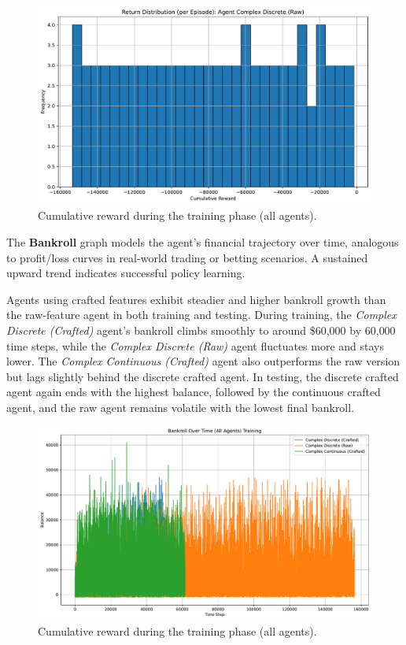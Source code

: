 \documentclass[sigconf]{acmart}
\begin{document}
\begin{figure}[t]
  \centering
  \includegraphics[width=\textwidth]{return_distribution_Complex Discrete (Raw).pdf}
  \caption{Cumulative reward during the training phase (all agents).}
  \label{fig:return_distribution_Complex Discrete (Raw)}
\end{figure}

The \textbf{Bankroll} graph models the agent's financial trajectory over time, analogous to profit/loss curves in real-world trading or betting scenarios. A sustained upward trend indicates successful policy learning. 

\bigskip

Agents using crafted features exhibit steadier and higher bankroll growth than the raw‐feature agent in both training and testing. During training, the \emph{Complex Discrete (Crafted)} agent’s bankroll climbs smoothly to around \$60{,}000 by 60{,}000 time steps, while the \emph{Complex Discrete (Raw)} agent fluctuates more and stays lower. The \emph{Complex Continuous (Crafted)} agent also outperforms the raw version but lags slightly behind the discrete crafted agent. In testing, the discrete crafted agent again ends with the highest balance, followed by the continuous crafted agent, and the raw agent remains volatile with the lowest final bankroll.

\bigskip

\begin{figure}[t]
  \centering
  \includegraphics[width=\textwidth]{bankroll_all_training.pdf}
  \caption{Cumulative reward during the training phase (all agents).}
  \label{fig:bankroll_all_training}
\end{figure}
\end{document}
